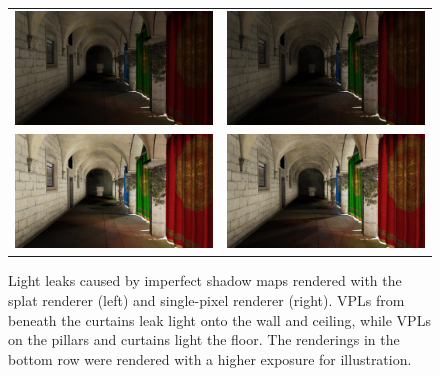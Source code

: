 \begin{figure}[htb]
\centering
  \begin{tabular}{@{}cc@{}}
    \includegraphics[width=.48\textwidth]{screenshots/leaks_splat} &
    \includegraphics[width=.48\textwidth]{screenshots/leaks_single_pixel}\\
    \includegraphics[width=.48\textwidth]{screenshots/leaks_splat_exposure} &
    \includegraphics[width=.48\textwidth]{screenshots/leaks_single_pixel_exposure}
  \end{tabular}
  \caption{Light leaks caused by imperfect shadow maps rendered with the splat renderer (left) and single-pixel renderer (right). VPLs from beneath the curtains leak light onto the wall and ceiling, while VPLs on the pillars and curtains light the floor. The renderings in the bottom row were rendered with a higher exposure for illustration. }
  \label{fig:results:leaks}
\end{figure}


